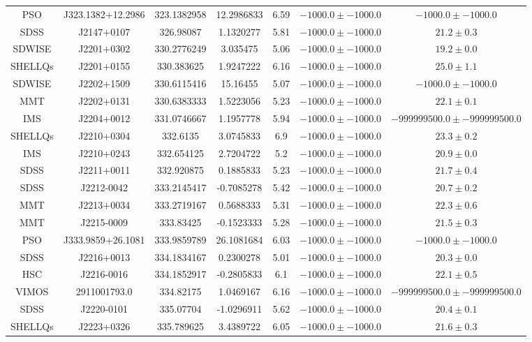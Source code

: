 \begin{table}
\begin{tabular}{ccccccc}
PSO & J323.1382+12.2986 & 323.1382958 & 12.2986833 & 6.59 & $-1000.0\pm-1000.0$ & $-1000.0\pm-1000.0$ \\
SDSS & J2147+0107 & 326.98087 & 1.1320277 & 5.81 & $-1000.0\pm-1000.0$ & $  21.2\pm  0.3$ \\
SDWISE & J2201+0302 & 330.2776249 & 3.035475 & 5.06 & $-1000.0\pm-1000.0$ & $  19.2\pm  0.0$ \\
SHELLQs & J2201+0155 & 330.383625 & 1.9247222 & 6.16 & $-1000.0\pm-1000.0$ & $  25.0\pm  1.1$ \\
SDWISE & J2202+1509 & 330.6115416 & 15.16455 & 5.07 & $-1000.0\pm-1000.0$ & $-1000.0\pm-1000.0$ \\
MMT & J2202+0131 & 330.6383333 & 1.5223056 & 5.23 & $-1000.0\pm-1000.0$ & $  22.1\pm  0.1$ \\
IMS & J2204+0012 & 331.0746667 & 1.1957778 & 5.94 & $-1000.0\pm-1000.0$ & $-999999500.0\pm-999999500.0$ \\
SHELLQs & J2210+0304 & 332.6135 & 3.0745833 & 6.9 & $-1000.0\pm-1000.0$ & $  23.3\pm  0.2$ \\
IMS & J2210+0243 & 332.654125 & 2.7204722 & 5.2 & $-1000.0\pm-1000.0$ & $  20.9\pm  0.0$ \\
SDSS & J2211+0011 & 332.920875 & 0.1885833 & 5.23 & $-1000.0\pm-1000.0$ & $  21.7\pm  0.4$ \\
SDSS & J2212-0042 & 333.2145417 & -0.7085278 & 5.42 & $-1000.0\pm-1000.0$ & $  20.7\pm  0.2$ \\
MMT & J2213+0034 & 333.2719167 & 0.5688333 & 5.31 & $-1000.0\pm-1000.0$ & $  22.3\pm  0.6$ \\
MMT & J2215-0009 & 333.83425 & -0.1523333 & 5.28 & $-1000.0\pm-1000.0$ & $  21.5\pm  0.3$ \\
PSO & J333.9859+26.1081 & 333.9859789 & 26.1081684 & 6.03 & $-1000.0\pm-1000.0$ & $-1000.0\pm-1000.0$ \\
SDSS & J2216+0013 & 334.1834167 & 0.2300278 & 5.01 & $-1000.0\pm-1000.0$ & $  20.3\pm  0.0$ \\
HSC & J2216-0016 & 334.1852917 & -0.2805833 & 6.1 & $-1000.0\pm-1000.0$ & $  22.1\pm  0.5$ \\
VIMOS & 2911001793.0 & 334.82175 & 1.0469167 & 6.16 & $-1000.0\pm-1000.0$ & $-999999500.0\pm-999999500.0$ \\
SDSS & J2220-0101 & 335.07704 & -1.0296911 & 5.62 & $-1000.0\pm-1000.0$ & $  20.4\pm  0.1$ \\
SHELLQs & J2223+0326 & 335.789625 & 3.4389722 & 6.05 & $-1000.0\pm-1000.0$ & $  21.6\pm  0.3$ \\

\end{tabular}
\end{table}
